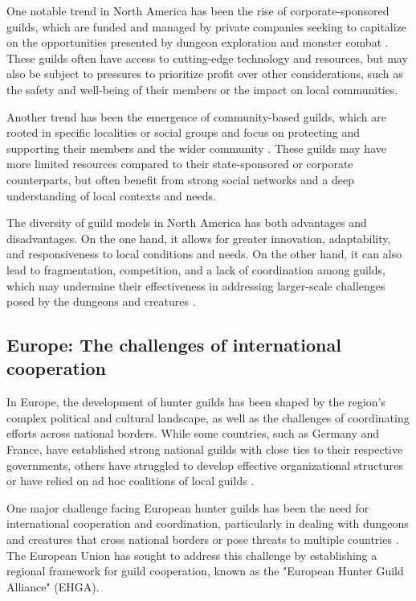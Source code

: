\documentclass[12pt]{article}
\begin{document}
One notable trend in North America has been the rise of corporate-sponsored guilds, which are funded and managed by private companies seeking to capitalize on the opportunities presented by dungeon exploration and monster combat \cite{Kwon2026}. These guilds often have access to cutting-edge technology and resources, but may also be subject to pressures to prioritize profit over other considerations, such as the safety and well-being of their members or the impact on local communities.

Another trend has been the emergence of community-based guilds, which are rooted in specific localities or social groups and focus on protecting and supporting their members and the wider community \cite{Nguyen2026}. These guilds may have more limited resources compared to their state-sponsored or corporate counterparts, but often benefit from strong social networks and a deep understanding of local contexts and needs.

The diversity of guild models in North America has both advantages and disadvantages. On the one hand, it allows for greater innovation, adaptability, and responsiveness to local conditions and needs. On the other hand, it can also lead to fragmentation, competition, and a lack of coordination among guilds, which may undermine their effectiveness in addressing larger-scale challenges posed by the dungeons and creatures \cite{Kwon2026}.

\subsection{Europe: The challenges of international cooperation}
In Europe, the development of hunter guilds has been shaped by the region's complex political and cultural landscape, as well as the challenges of coordinating efforts across national borders. While some countries, such as Germany and France, have established strong national guilds with close ties to their respective governments, others have struggled to develop effective organizational structures or have relied on ad hoc coalitions of local guilds \cite{Mayer2027}.

One major challenge facing European hunter guilds has been the need for international cooperation and coordination, particularly in dealing with dungeons and creatures that cross national borders or pose threats to multiple countries \cite{Krasniqi2027}. The European Union has sought to address this challenge by establishing a regional framework for guild cooperation, known as the "European Hunter Guild Alliance" (EHGA).
\end{document}
